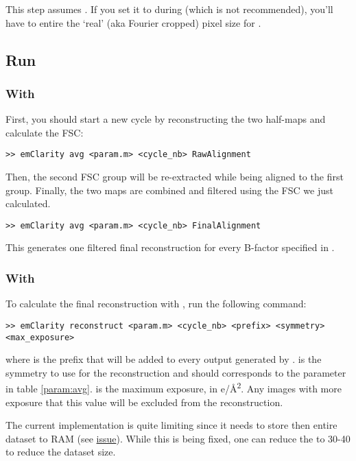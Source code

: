 \begin{note}This step assumes . If you set it to  during  (which is not recommended), you'll have to entire the `real' (aka Fourier cropped) pixel size for .\end{note}

\subsection{Run}

\subsubsection{With {\emClarity}}

First, you should start a new cycle by reconstructing the two half-maps and calculate the FSC:
\begin{lstlisting}
>> emClarity avg <param.m> <cycle_nb> RawAlignment
\end{lstlisting}
Then, the second FSC group will be re-extracted while being aligned to the first group. Finally, the two maps are combined and filtered using the FSC we just calculated.
\begin{lstlisting}
>> emClarity avg <param.m> <cycle_nb> FinalAlignment
\end{lstlisting}
This generates one filtered final reconstruction for every B-factor specified in .

\subsubsection{With {\cisTEM}}
To calculate the final reconstruction with {\cisTEM}, run the following command:
\begin{lstlisting}
>> emClarity reconstruct <param.m> <cycle_nb> <prefix> <symmetry> <max_exposure>
\end{lstlisting}
where  is the prefix that will be added to every output generated by {\cisTEM}.  is the symmetry to use for the reconstruction and should corresponds to the  parameter in table \ref{param:avg}.  is the maximum exposure, in e/\si{\angstrom}\textsuperscript{2}. Any images with more exposure that this value will be excluded from the reconstruction.

\begin{note}The current implementation is quite limiting since it needs to store then entire dataset to RAM (see \href{https://github.com/bHimes/emClarity/issues/139}{issue}). While this is being fixed, one can reduce the  to 30-40 to reduce the dataset size.\end{note}

